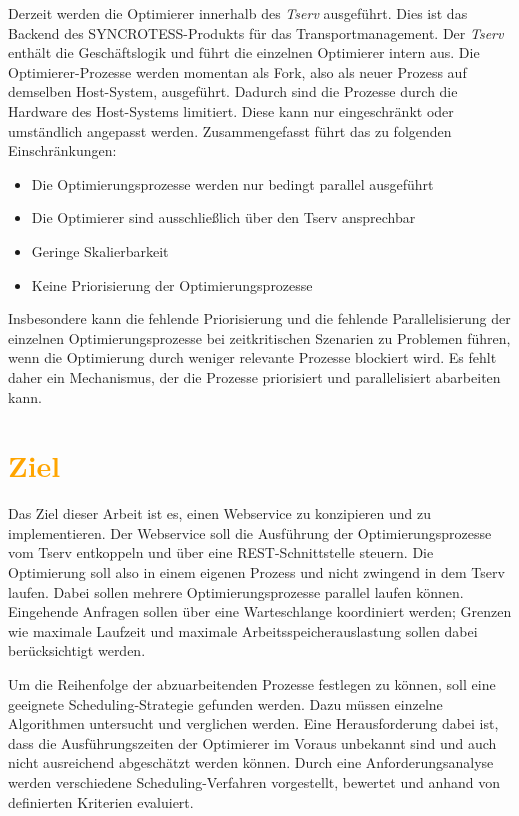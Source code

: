 \documentclass[
    12pt,               
    a4paper,            
    ngerman,            
    parskip=half,       
    headings=normal,   
    numbers=enddot,     
    toc=chapterentrywithdots 
]{scrreprt}\usepackage[utf8]{inputenc}
\begin{document}
Derzeit werden die Optimierer innerhalb des \textit{Tserv} ausgeführt. Dies ist das Backend des SYNCROTESS-Produkts für das Transportmanagement. Der \textit{Tserv} enthält die Geschäftslogik und führt die einzelnen Optimierer intern aus. Die Optimierer-Prozesse werden momentan als Fork, also als neuer Prozess auf demselben Host-System, ausgeführt. Dadurch sind die Prozesse durch die Hardware des Host-Systems limitiert. Diese kann nur eingeschränkt oder umständlich angepasst werden. Zusammengefasst führt das zu folgenden Einschränkungen:
\begin{itemize}
    \item Die Optimierungsprozesse werden nur bedingt parallel ausgeführt
    \item Die Optimierer sind ausschließlich über den Tserv ansprechbar
    \item Geringe Skalierbarkeit
    \item Keine Priorisierung der Optimierungsprozesse
\end{itemize}

Insbesondere kann die fehlende Priorisierung und die fehlende Parallelisierung der einzelnen Optimierungsprozesse bei zeitkritischen Szenarien zu Problemen führen, wenn die Optimierung durch weniger relevante Prozesse blockiert wird. Es fehlt daher ein Mechanismus, der die Prozesse priorisiert und parallelisiert abarbeiten kann.

\section{\textcolor{orange}{Ziel}}

Das Ziel dieser Arbeit ist es, einen Webservice zu konzipieren und zu implementieren. Der Webservice soll die Ausführung der Optimierungsprozesse vom Tserv entkoppeln und über eine REST-Schnittstelle steuern. Die Optimierung soll also in einem eigenen Prozess und nicht zwingend in dem Tserv laufen. Dabei sollen mehrere Optimierungsprozesse parallel laufen können. Eingehende Anfragen sollen über eine Warteschlange koordiniert werden; Grenzen wie maximale Laufzeit und maximale Arbeitsspeicherauslastung sollen dabei berücksichtigt werden.

Um die Reihenfolge der abzuarbeitenden Prozesse festlegen zu können, soll eine geeignete Scheduling-Strategie gefunden werden. Dazu müssen einzelne Algorithmen untersucht und verglichen werden. Eine Herausforderung dabei ist, dass die Ausführungszeiten der Optimierer im Voraus unbekannt sind und auch nicht ausreichend abgeschätzt werden können. Durch eine Anforderungsanalyse werden verschiedene Scheduling-Verfahren vorgestellt, bewertet und anhand von definierten Kriterien evaluiert.
\end{document}

